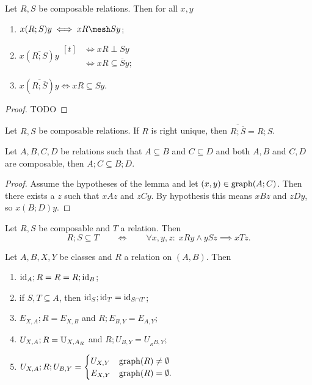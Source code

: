 \begin{lemma} \label{setOfRelationComposition}
Let $R,S$ be composable relations. Then for all $x,y$
\begin{enumerate}
\item $x(R;S)y \iff xR \mesh Sy$;
\item $x(\overline{R;S})y \begin{aligned}[t]
&\iff xR\perp Sy \\
&\iff xR \subseteq \overline{S}y;
\end{aligned}$
\item $x(\overline{R;\overline{S}})y \iff xR \subseteq Sy$.
\end{enumerate}
\end{lemma}
\begin{proof}
TODO
\end{proof}
\begin{corollary}
Let $R,S$ be composable relations. If $R$ is right unique, then $\overline{R;\overline{S}} = R;S$.
\end{corollary}


\begin{lemma}
Let $A,B,C,D$ be relations such that $A \subseteq B$ and $C\subseteq D$ and both $A,B$ and $C,D$ are composable, then $A;C\subseteq B;D$.
\end{lemma}
\begin{proof}
Assume the hypotheses of the lemma and let $(x,y) \in \operatorname{graph}(A;C)$. Then there exists a $z$ such that $xAz$ and $zCy$. By hypothesis this means $xBz$ and $zDy$, so $x(B;D)y$.
\end{proof}

\begin{lemma} \label{universalQuantificationForCompositionSuperset}
Let $R,S$ be composable and $T$ a relation. Then
\[ R;S \subseteq T \qquad\iff\qquad \forall x,y,z:\; xRy \land ySz \implies xTz. \]
\end{lemma}

\begin{lemma} \label{compositionCanonicalRelations}
Let $A,B,X, Y$ be classes and $R$ a relation on $(A, B)$. Then
\begin{enumerate}
\item $\operatorname{id}_A;R = R = R;\operatorname{id}_B$;
\item if $S,T\subseteq A$, then $\operatorname{id}_{S};\operatorname{id}_{T} = \operatorname{id}_{S\cap T}$;
\item $E_{X,A};R = E_{X,B}$ and $R; E_{B,Y} = E_{A,Y}$;
\item $U_{X,A};R = \operatorname{U}_{X,A_R}$ and $R; U_{B,Y} = U_{_RB, Y}$;
\item $U_{X,A};R;U_{B,Y} = \begin{cases}
U_{X,Y} & \operatorname{graph}(R) \neq \emptyset \\
E_{X,Y} & \operatorname{graph}(R) = \emptyset.
\end{cases}$
\end{enumerate}
\end{lemma}

